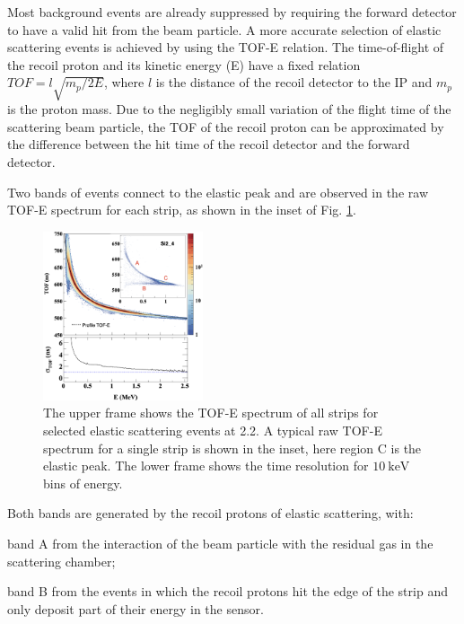 \documentclass[number,5p]{elsarticle}
\begin{document}
Most background events are already suppressed by requiring the forward detector to have a valid hit from the beam particle.
A more accurate selection of elastic scattering events is achieved by using the TOF-E relation.
The time-of-flight of the recoil proton and its kinetic energy (E)
have a fixed relation $TOF = l\sqrt{m_p/2E}$, where $l$ is the distance of
the recoil detector to the IP and $m_p$ is the proton mass.
Due to the negligibly small variation of the flight time of the scattering beam particle,
the TOF of the recoil proton can be approximated by the difference between the hit time of the recoil detector and the forward detector.

Two bands of events connect to the elastic peak and are observed in the raw TOF-E spectrum for each strip, as shown in the inset of Fig. \ref{fig:tof-e}.
\begin{figure}[b!]
  \centering
  \includegraphics[width=0.42\textwidth]{./tofe_tsigma.png}
  \caption{
    The upper frame shows the TOF-E spectrum of all strips for selected elastic
    scattering events at \SI{2.2}{\momentum}.
    A typical raw TOF-E spectrum for a single strip is shown in the inset, here region C is the elastic peak.
    The lower frame shows the time resolution for $\SI{10}{\keV}$ bins of energy.
  }
  \label{fig:tof-e}
\end{figure}
Both bands are generated by the recoil protons of elastic scattering, with:
\begin{enumerate*}[label=(\roman*)]
\item band A from the interaction of the beam particle with the residual gas in the scattering chamber;
\item band B from the events in which the recoil protons hit the edge of the strip and only deposit part of their energy in the sensor.
\end{enumerate*}
\end{document}
